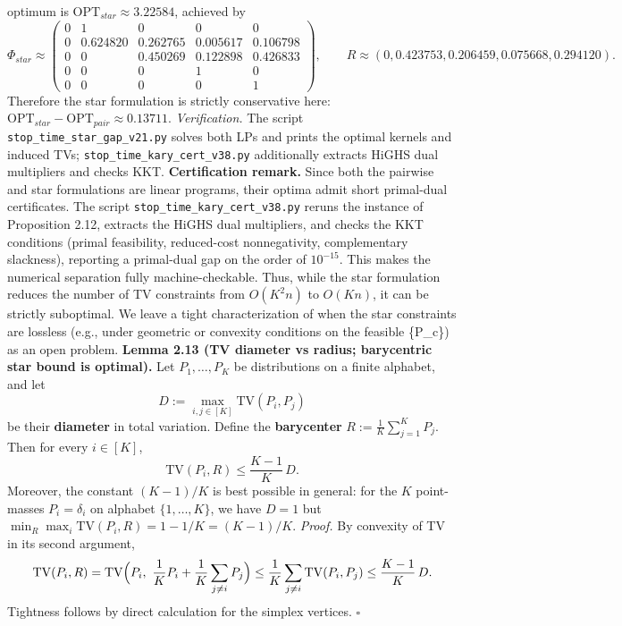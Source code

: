\documentclass[11pt]{article}
\begin{document}
optimum is \(\mathrm{OPT}_{star}\approx 3.22584\), achieved by \[
\Phi_{star} \approx
\begin{pmatrix}
0 & 1 & 0 & 0 & 0\\
0 & 0.624820 & 0.262765 & 0.005617 & 0.106798\\
0 & 0 & 0.450269 & 0.122898 & 0.426833\\
0 & 0 & 0 & 1 & 0\\
0 & 0 & 0 & 0 & 1
\end{pmatrix},
\qquad
R\approx (0,0.423753,0.206459,0.075668,0.294120).
\] Therefore the star formulation is strictly conservative here:
\(\mathrm{OPT}_{star}-\mathrm{OPT}_{pair}\approx 0.13711\).
\emph{Verification.} The script \texttt{stop\_time\_star\_gap\_v21.py}
solves both LPs and prints the optimal kernels and induced TVs;
\texttt{stop\_time\_kary\_cert\_v38.py} additionally extracts HiGHS dual
multipliers and checks KKT. \textbf{Certification remark.} Since both
the pairwise and star formulations are linear programs, their optima
admit short primal-dual certificates. The script
\texttt{stop\_time\_kary\_cert\_v38.py} reruns the instance of
Proposition 2.12, extracts the HiGHS dual multipliers, and checks the
KKT conditions (primal feasibility, reduced-cost nonnegativity,
complementary slackness), reporting a primal-dual gap on the order of
\(10^{-15}\). This makes the numerical separation fully
machine-checkable. Thus, while the star formulation reduces the number
of TV constraints from \(O(K^2n)\) to \(O(Kn)\), it can be strictly
suboptimal. We leave a tight characterization of when the star
constraints are lossless (e.g., under geometric or convexity conditions
on the feasible \{P\_c\}) as an open problem. \textbf{Lemma 2.13 (TV
diameter vs radius; barycentric star bound is optimal).} Let
\(P_1,\dots,P_K\) be distributions on a finite alphabet, and let \[
D:= \max_{i,j\in[K]} \mathrm{TV}(P_i,P_j)
\] be their \textbf{diameter} in total variation. Define the
\textbf{barycenter} \(R:= \frac{1}{K}\sum_{j=1}^K P_j\). Then for every
\(i\in[K]\), \[
\mathrm{TV}(P_i,R) \le \frac{K-1}{K}\,D.
\] Moreover, the constant \((K-1)/K\) is best possible in general: for
the \(K\) point-masses \(P_i=\delta_i\) on alphabet \(\{1,\dots,K\}\),
we have \(D=1\) but \(\min_R\max_i\mathrm{TV}(P_i,R)=1-1/K=(K-1)/K\).
\emph{Proof.} By convexity of TV in its second argument, \[
\mathrm{TV}(P_i,R)
= \mathrm{TV}\Bigl(P_i,\ \frac{1}{K}P_i + \frac{1}{K}\sum_{j\ne i} P_j\Bigr)
\le \frac{1}{K}\sum_{j\ne i} \mathrm{TV}(P_i,P_j)
\le \frac{K-1}{K}\,D.
\] Tightness follows by direct calculation for the simplex vertices.
\(\square\)
\end{document}
